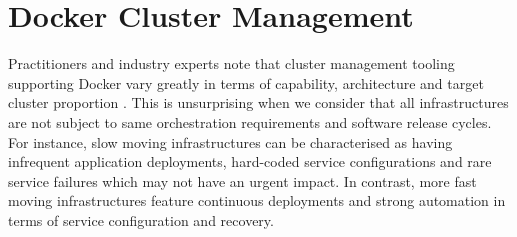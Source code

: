 \documentclass{article}
\begin{document}
\section{Docker Cluster Management}
Practitioners and industry experts note that cluster management tooling supporting Docker
vary greatly in terms of capability, architecture and target cluster proportion
\citep{goasguen, holla}. This is unsurprising when we consider that all infrastructures
are not subject to same orchestration requirements and software release cycles.
For instance, slow moving infrastructures can be characterised as having infrequent application deployments,
 hard-coded service configurations and rare service failures which may not have an urgent impact. In contrast, more fast moving infrastructures feature continuous deployments and strong automation in terms of service configuration and recovery.
\end{document}
